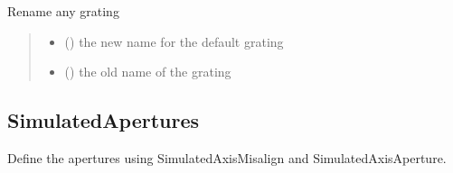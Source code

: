 \documentclass[letterpaper,10pt,english]{sphinxmanual}
\begin{document}
\begin{fulllineitems}
\begin{fulllineitems}
\begin{quote}
\begin{description}
\end{description}\end{quote}

\end{fulllineitems}


\begin{fulllineitems}
\label{\detokenize{API:raypyng_bluesky.devices.SimulatedPGM.rename_grating}}
\pysigstartsignatures
{}
\pysigstopsignatures
\sphinxAtStartPar
Rename any grating
\begin{quote}\begin{description}
\begin{itemize}
\item {} 
\sphinxAtStartPar
{} () \textendash{} the new name for the default grating

\item {} 
\sphinxAtStartPar
{} () \textendash{} the old name of the grating

\end{itemize}

\end{description}\end{quote}

\end{fulllineitems}


\end{fulllineitems}



\subsection{SimulatedApertures}
\label{\detokenize{API:simulatedapertures}}

\begin{fulllineitems}
\label{\detokenize{API:raypyng_bluesky.devices.SimulatedApertures}}
\pysigstartsignatures
{}
\pysigstopsignatures
\sphinxAtStartPar
Define the apertures using SimulatedAxisMisalign
and SimulatedAxisAperture.

\end{fulllineitems}
\end{document}

